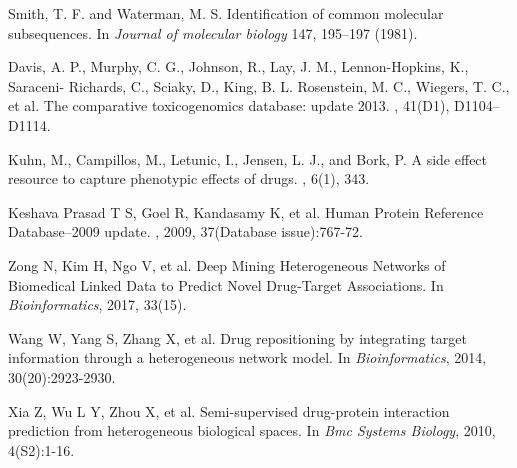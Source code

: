 \documentclass[conference]{IEEEtran}
\begin{document}
\begin{thebibliography}{10}
Smith, T. F. and Waterman, M. S. 
\newblock Identification of common molecular subsequences. 
\newblock In {\em Journal of molecular biology} 147, 195–197 (1981).


Davis, A. P., Murphy, C. G., Johnson, R., Lay, J. M., Lennon-Hopkins, K., Saraceni- Richards, C., Sciaky, D., King, B. L. Rosenstein, M. C., Wiegers, T. C., et al. 
\newblock The comparative toxicogenomics database: update 2013.
, 41(D1), D1104–D1114.


Kuhn, M., Campillos, M., Letunic, I., Jensen, L. J., and Bork, P.  
\newblock A side effect resource to capture phenotypic effects of drugs. 
, 6(1), 343.

Keshava Prasad T S, Goel R, Kandasamy K, et al. 
\newblock Human Protein Reference Database--2009 update.
, 2009, 37(Database issue):767-72.


Zong N, Kim H, Ngo V, et al. 
\newblock Deep Mining Heterogeneous Networks of Biomedical Linked Data to Predict Novel Drug-Target Associations. 
\newblock In {\em Bioinformatics}, 2017, 33(15).


Wang W, Yang S, Zhang X, et al. 
\newblock Drug repositioning by integrating target information through a heterogeneous network model. 
\newblock In {\em Bioinformatics}, 2014, 30(20):2923-2930.



Xia Z, Wu L Y, Zhou X, et al. 
\newblock Semi-supervised drug-protein interaction prediction from heterogeneous biological spaces. 
\newblock In {\em Bmc Systems Biology}, 2010, 4(S2):1-16.

\end{thebibliography}
\end{document}
